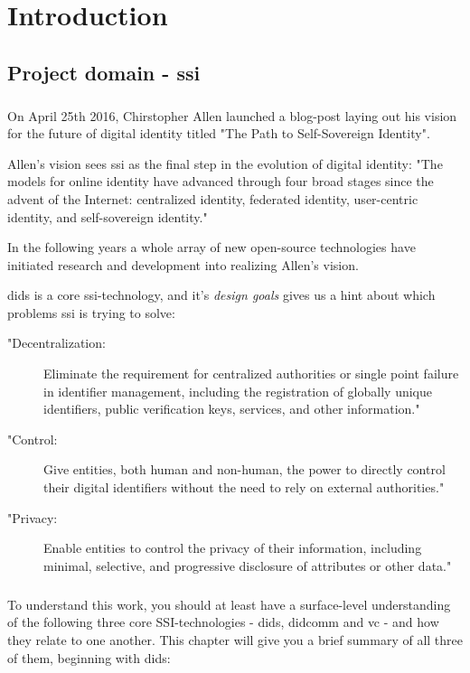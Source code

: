 \chapter{Introduction}



\section{Project domain - \acrfull{ssi}}

\paragraph{}
On April 25th 2016, Chirstopher Allen launched a blog-post laying out his vision for the future of digital identity titled "The Path to Self-Sovereign Identity"\cite{ThePathToSelfSovereignIdentity}. 

Allen's vision sees \acrfull{ssi} as the final step in the evolution of digital identity: "The models for online identity have advanced through four broad stages since the advent of the Internet: centralized identity, federated identity, user-centric identity, and self-sovereign identity."\cite{ThePathToSelfSovereignIdentity}

In the following years a whole array of new open-source technologies have initiated research and development into realizing Allen's vision. 

\acrfull{dids} is a core \acrshort{ssi}-technology, and it's \textit{design goals}\cite{DIDDesignGoals} gives us a hint about which problems \acrshort{ssi} is trying to solve:
\begin{description}
    \item["Decentralization:] Eliminate the requirement for centralized authorities or single point failure in identifier management, including the registration of globally unique identifiers, public verification keys, services, and other information."
    \item["Control:] Give entities, both human and non-human, the power to directly control their digital identifiers without the need to rely on external authorities."
    \item ["Privacy:] Enable entities to control the privacy of their information, including minimal, selective, and progressive disclosure of attributes or other data."
\end{description}

\paragraph{}
To understand this work, you should at least have a surface-level understanding of the following three core SSI-technologies - \acrfull{dids}, \acrfull{didcomm} and \acrfull{vc} - and how they relate to one another. This chapter will give you a brief summary of all three of them, beginning with \acrshort{dids}:

